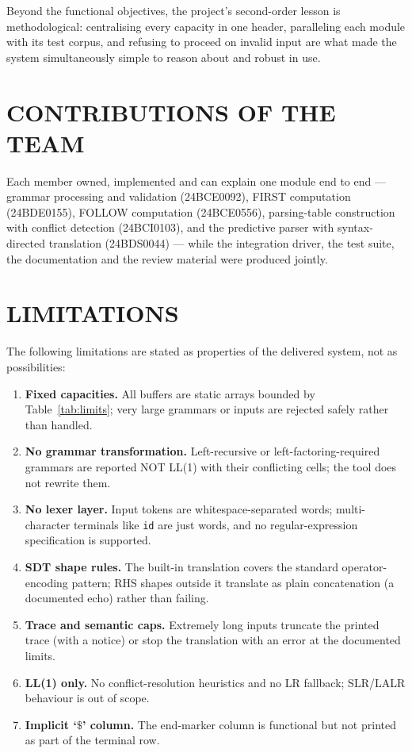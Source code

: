 \documentclass[12pt,a4paper,oneside,openany]{report}
\newcommand{\code}[1]{\texttt{#1}}
\begin{document}
Beyond the functional objectives, the project's second-order lesson is
methodological: centralising every capacity in one header, paralleling
each module with its test corpus, and refusing to proceed on invalid
input are what made the system simultaneously simple to reason about and
robust in use.

\section{CONTRIBUTIONS OF THE TEAM}
Each member owned, implemented and can explain one module end to end ---
grammar processing and validation (24BCE0092), FIRST computation
(24BDE0155), FOLLOW computation (24BCE0556), parsing-table construction
with conflict detection (24BCI0103), and the predictive parser with
syntax-directed translation (24BDS0044) --- while the integration driver,
the test suite, the documentation and the review material were produced
jointly.

\section{LIMITATIONS}
The following limitations are stated as properties of the delivered
system, not as possibilities:
\begin{enumerate}
  \item \textbf{Fixed capacities.} All buffers are static arrays bounded
        by Table~\ref{tab:limits}; very large grammars or inputs are
        rejected safely rather than handled.
  \item \textbf{No grammar transformation.} Left-recursive or
        left-factoring-required grammars are reported NOT LL(1) with
        their conflicting cells; the tool does not rewrite them.
  \item \textbf{No lexer layer.} Input tokens are whitespace-separated
        words; multi-character terminals like \code{id} are just words,
        and no regular-expression specification is supported.
  \item \textbf{SDT shape rules.} The built-in translation covers the
        standard operator-encoding pattern; RHS shapes outside it
        translate as plain concatenation (a documented echo) rather than
        failing.
  \item \textbf{Trace and semantic caps.} Extremely long inputs truncate
        the printed trace (with a notice) or stop the translation with an
        error at the documented limits.
  \item \textbf{LL(1) only.} No conflict-resolution heuristics and no LR
        fallback; SLR/LALR behaviour is out of scope.
  \item \textbf{Implicit `$\$$' column.} The end-marker column is
        functional but not printed as part of the terminal row.
\end{enumerate}
\end{document}
